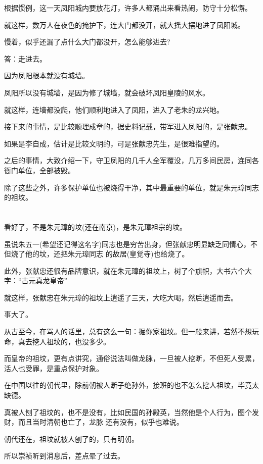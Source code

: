 \documentclass[11pt,a4paper,onecolumn]{article}
\begin{document}
根据惯例，这一天凤阳城内要放花灯，许多人都涌出来看热闹，防守十分松懈。

就这样，数万人在夜色的掩护下，连大门都没开，就大摇大摆地进了凤阳城。

慢着，似乎还漏了点什么\myrule 大门都没开，怎么能够进去?

答：走进去。

因为凤阳根本就没有城墙。

凤阳所以没有城墙，是因为修了城墙，就会破坏凤阳皇陵的风水。

就这样，连墙都没爬，他们顺利地进入了凤阳，进入了老朱的龙兴地。

接下来的事情，是比较顺理成章的，据史料记载，带军进入凤阳的，是张献忠。

如果是李自成，估计是比较文明的，可是张献忠先生，是很难指望的。

之后的事情，大致介绍一下，守卫凤阳的几千人全军覆没，几万多间民房，连同各衙门单位，全部被毁。

除了这些之外，许多保护单位也被烧得干净，其中最重要的单位，就是朱元璋同志的祖坟。

\section[\thesection]{}

看好了，不是朱元璋的坟(还在南京)，是朱元璋祖宗的坟。

虽说朱五一(希望还记得这名字)同志也是穷苦出身，但张献忠明显缺乏同情心，不但烧了他的坟，还把朱元璋同志
的故居(皇觉寺)也给烧了。

此外，张献忠还很有品牌意识，就在朱元璋的祖坟上，树了个旗帜，大书六个大字：``古元真龙皇帝''

就这样，张献忠在朱元璋的祖坟上逍遥了三天，大吃大喝，然后逍遥而去。

事大了。

从古至今，在骂人的话里，总有这么一句：掘你家祖坟。但一般来讲，若然不想玩命，真去挖人祖坟的，也没多少。

而皇帝的祖坟，更有点讲究，通俗说法叫做龙脉，一旦被人挖断，不但死人受累，活人也受罪，是重点保护对象。

在中国以往的朝代里，除前朝被人断子绝孙外，接班的也不怎么挖人祖坟，毕竟太缺德。

真被人刨了祖坟的，也不是没有，比如民国的孙殿英，当然他是个人行为，图个发财，而且当时清朝也亡了，龙脉
还有没有，似乎也难说。

朝代还在，祖坟就被人刨了的，只有明朝。

所以崇祯听到消息后，差点晕了过去。
\end{document}
